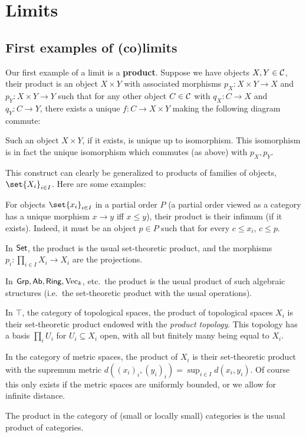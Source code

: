 \section{Limits}

\subsection{First examples of (co)limits}

Our first example of a limit is a {\bf product}.
Suppose we have objects $X,Y\in{{\cal C}}$, their product is an object $X\times Y$ with associated morphisms $p_X\colon X\times Y\to X$ and $p_Y\colon X\times Y\to Y$ such that
for any other object $C\in{{\cal C}}$ with $q_X\colon C\to X$ and $q_Y\colon C\to Y$, there exists a unique $f\colon C\to X\times Y$ making the following diagram commute:

\centerline{}

Such an object $X\times Y$, if it exists, is unique up to isomorphism.
This isomorphism is in fact the unique isomorphism which commutes (as above) with $p_X,p_Y$.

This construct can clearly be generalized to products of families of objects, $\set{X_i}_{i\in I}$.
Here are some examples:

\benum
    \item For objects $\set{x_i}_{i\in I}$ in a partial order $P$ (a partial order viewed as a category has a unique morphism $x\to y$ iff $x\leq y$), their product is their infimum (if it exists).
    Indeed, it must be an object $p\in P$ such that for every $c\leq x_i$, $c\leq p$.
    \item In ${\sf Set}$, the product is the usual set-theoretic product, and the morphisms $p_i\colon\prod_{i\in I}X_i\to X_i$ are the projections.
    \item In ${\sf Grp},{\sf Ab},{\sf Ring},{\rm Vec}_k$, etc.\ the product is the usual product of such algebraic structures (i.e.\ the set-theoretic product with the usual operations).
    \item In $\top$, the category of topological spaces, the product of topological spaces $X_i$ is their set-theoretic product endowed with the {\it product topology}.
    This topology has a basis $\prod_iU_i$ for $U_i\subseteq X_i$ open, with all but finitely many being equal to $X_i$.
    \item In the category of metric spaces, the product of $X_i$ is their set-theoretic product with the supremum metric $d((x_i)_i,(y_i)_i)=\sup_{i\in I}d(x_i,y_i)$.
    Of course this only exists if the metric spaces are uniformly bounded, or we allow for infinite distance.
    \item The product in the category of (small or locally small) categories is the usual product of categories.
\eenum

